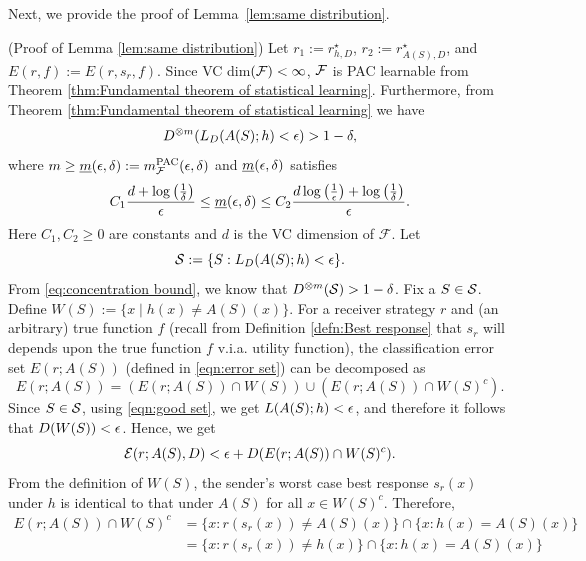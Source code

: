 Next, we provide the proof of Lemma~\ref{lem:same distribution}.

\begin{apdxproof}(Proof of Lemma \ref{lem:same distribution})\label{proof:same distribution}
Let $r_1 := r^\star_{h,D}$, $r_2 := r^\star_{A(S),D}$, and $E(r,f) := E(r,s_r,f)$.
Since VC dim$(\mathcal{F}) < \infty$,  $\mathcal{F}$ is PAC learnable from Theorem \ref{thm:Fundamental theorem of statistical learning}. Furthermore, from Theorem  \ref{thm:Fundamental theorem of statistical learning} we have
\begin{equation}\label{eq:concentration bound}
    D^{\otimes m}(L_{D}(A(S);h) < \epsilon) > 1 - \delta,
\end{equation}
where $m \geq \underline{m}(\epsilon,\delta) := m_{\mathcal{F}}^{\mathrm{PAC}}(\epsilon,\delta)$ and $\underline{m}(\epsilon,\delta)$ satisfies 
\begin{equation*}
    C_1 \frac{d + \log\left(\frac{1}{\delta}\right)}{\epsilon} \leq \underline{m}(\epsilon,\delta) \leq C_2 \frac{d \log\left(\frac{1}{\epsilon}\right) + \log\left(\frac{1}{\delta}\right)}{\epsilon}.
\end{equation*}
Here $C_1, C_2 \geq 0$ are constants and $d$ is the VC dimension of $\mathcal{F}$.
Let 
\begin{equation}\label{eqn:good set}
    \mathcal{S} := \{S: L_D(A(S);h) < \epsilon\}.
\end{equation}
From \eqref{eq:concentration bound}, we know that $D^{\otimes m}(\mathcal{S}) > 1-\delta$.
Fix a $S \in \mathcal{S}$. Define $W(S) := \{x \mid h(x) \neq A(S)(x)\}$. For a receiver strategy $r$ and (an arbitrary) true function $f$ (recall from Definition \ref{defn:Best response} that $s_r$ will depends upon the true function $f$ v.i.a. utility function), the classification error set $E(r;A(S))$ (defined in \eqref{eqn:error set}) can be decomposed as
\[
E(r; A(S)) = (E(r; A(S)) \cap W(S)) \cup (E(r; A(S)) \cap W(S)^c).
\]
Since $S \in \mathcal{S}$, using \eqref{eqn:good set}, we get $L(A(S);h) < \epsilon$, and therefore it follows that $D(W(S)) < \epsilon$. Hence, we get
\[
\mathcal{E}(r; A(S),D) < \epsilon + D(E(r; A(S)) \cap W(S)^c).
\]
From the definition of $W(S)$, the sender's worst case best response $s_r(x)$ under $h$ is identical to that under $A(S)$ for all $x \in W(S)^c$. Therefore,
\begin{equation}
    \begin{aligned}
        E(r;A(S)) \cap W(S)^c &= \{x:r(s_r(x)) \neq A(S)(x)\} \cap \{x: h(x) = A(S)(x)\} \\
        &= \{x:r(s_r(x)) \neq h(x)\} \cap \{x: h(x) = A(S)(x)\} \\

\end{aligned}
\end{equation}
\end{apdxproof}
